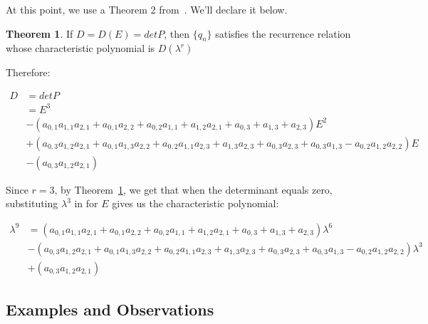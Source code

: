 \documentclass[a4paper]{article}
\theoremstyle{definition}
\newtheorem{theorem}{Theorem}[section]
\begin{document}
At this point, we use a Theorem 2 from~\cite{bib:gen_cond_rec}. We'll declare it below.

\begin{theorem}
If $D=D(E)=detP$, then $\{q_n\}$  satisfies the recurrence relation whose characteristic polynomial is
$D(\lambda^r)$
\label{thm:det-is-char-poly-dxr}
\end{theorem}

Therefore:

\begin{align*}
D
&=detP \\
&=E^3 \\
&- (a_{0,1}a_{1,1}a_{2,1}+a_{0,1}a_{2,2}+a_{0,2}a_{1,1}+a_{1,2}a_{2,1}+a_{0,3}+a_{1,3}+a_{2,3})E^2 \\
&+ (a_{0,3}a_{1,2}a_{2,1}+a_{0,1}a_{1,3}a_{2,2}+a_{0,2}a_{1,1}a_{2,3}+a_{1,3}a_{2,3}+a_{0,3}a_{2,3}+a_{0,3}a_{1,3}-a_{0,2}a_{1,2}a_{2,2})E \\
&-(a_{0,3}a_{1,2}a_{2,1})
\end{align*}

Since $r=3$, by Theorem~\ref{thm:det-is-char-poly-dxr}, we get that when the determinant equals zero,
substituting $\lambda^3$ in for $E$ gives us the characteristic polynomial:

\begin{align*}
\lambda^9
&= (a_{0,1}a_{1,1}a_{2,1}+a_{0,1}a_{2,2}+a_{0,2}a_{1,1}+a_{1,2}a_{2,1}+a_{0,3}+a_{1,3}+a_{2,3})\lambda^6 \\
&- (a_{0,3}a_{1,2}a_{2,1}+a_{0,1}a_{1,3}a_{2,2}+a_{0,2}a_{1,1}a_{2,3}+a_{1,3}a_{2,3}+a_{0,3}a_{2,3}+a_{0,3}a_{1,3}-a_{0,2}a_{1,2}a_{2,2})\lambda^3 \\
&+(a_{0,3}a_{1,2}a_{2,1})
\end{align*}

\subsection{Examples and Observations}
\end{document}
